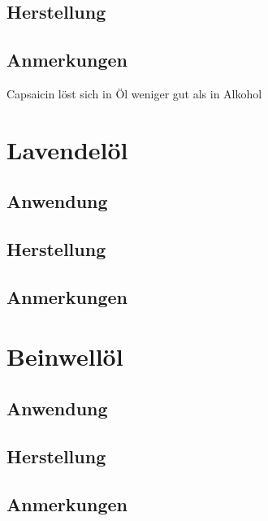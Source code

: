 \subsection{Herstellung}
\subsection{Anmerkungen}

Capsaicin löst sich in Öl weniger gut als in Alkohol



\newpage



\section{Lavendelöl}


\subsection{Anwendung}
\subsection{Herstellung}
\subsection{Anmerkungen}



\newpage




\section{Beinwellöl}


\subsection{Anwendung}
\subsection{Herstellung}
\subsection{Anmerkungen}




